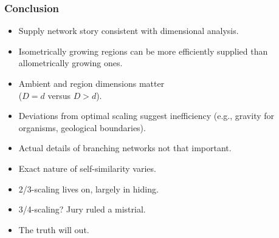 \begin{frame}
  \small
  \frametitle{Conclusion}

  \begin{block}{}
  \begin{itemize}
  \item<+->
    Supply network story consistent with dimensional analysis.
  \item<+->
    Isometrically growing regions can be
    more efficiently supplied than allometrically growing ones.
  \item<+-> 
    Ambient and region dimensions matter\\ ($D=d$ versus $D>d$).
  \item<+-> 
    Deviations from optimal scaling suggest inefficiency
    (e.g., gravity for organisms, geological boundaries).
  \item<+-> 
    Actual details of branching networks not that important.
  \item<+->
    Exact nature of self-similarity varies.
  \item<+->
    2/3-scaling lives on, largely in hiding.
  \item<+->
    3/4-scaling?  Jury ruled a mistrial.
  \item<+->
    The truth will out.
  \end{itemize}
  \end{block}


\end{frame}

